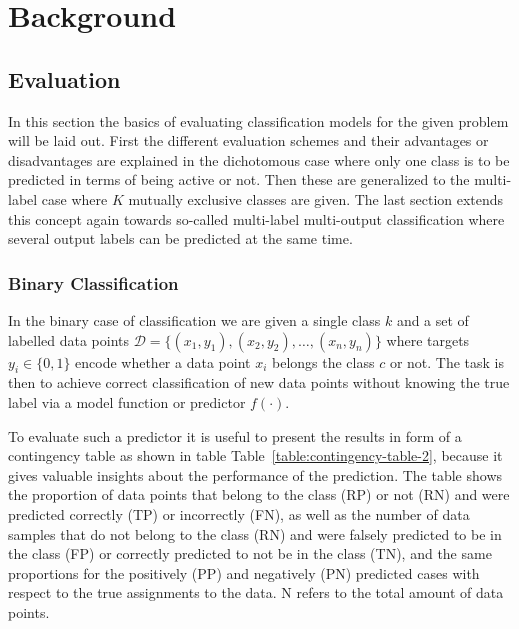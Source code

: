 
\clearpage

\section{Background}
\label{sec:Background}

\subsection{Evaluation}
\label{sub:Evaluation}

In this section the basics of evaluating classification models for the given problem will be laid out. First the different evaluation schemes and their advantages or disadvantages are explained in the dichotomous case where only one class is to be predicted in terms of being active or not. Then these are generalized to the multi-label case where $K$ mutually exclusive classes are given. The last section extends this concept again towards so-called multi-label multi-output classification where several output labels can be predicted at the same time.

\subsubsection{Binary Classification}
\label{subs:Binary Classification}

In the binary case of classification we are given a single class $k$ and a set of labelled data points $\mathcal{D} = \{ (x_1, y_1), (x_2, y_2), \ldots, (x_n, y_n) \}$ where targets $y_i \in \{0, 1\}$ encode whether a data point $x_i$ belongs the class $c$ or not. The task is then to achieve correct classification of new data points without knowing the true label via a model function or predictor $f(\cdot)$.

To evaluate such a predictor it is useful to present the results in form of a contingency table as shown in table Table~\ref{table:contingency-table-2}, because it gives valuable insights about the performance of the prediction. The table shows the proportion of data points that belong to the class (RP) or not (RN) and were predicted correctly (TP) or incorrectly (FN), as well as the number of data samples that do not belong to the class (RN) and were falsely predicted to be in the class (FP) or correctly predicted to not be in the class (TN), and the same proportions for the positively (PP) and negatively (PN) predicted cases with respect to the true assignments to the data. N refers to the total amount of data points.

